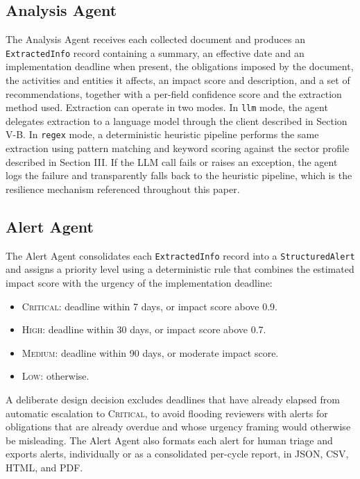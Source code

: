 \documentclass[conference]{IEEEtran}
\begin{document}
\subsection{Analysis Agent}

The Analysis Agent receives each collected document and produces an \texttt{ExtractedInfo} record containing a summary, an effective date and an implementation deadline when present, the obligations imposed by the document, the activities and entities it affects, an impact score and description, and a set of recommendations, together with a per-field confidence score and the extraction method used. Extraction can operate in two modes. In \texttt{llm} mode, the agent delegates extraction to a language model through the client described in Section V-B. In \texttt{regex} mode, a deterministic heuristic pipeline performs the same extraction using pattern matching and keyword scoring against the sector profile described in Section III. If the LLM call fails or raises an exception, the agent logs the failure and transparently falls back to the heuristic pipeline, which is the resilience mechanism referenced throughout this paper.

\subsection{Alert Agent}

The Alert Agent consolidates each \texttt{ExtractedInfo} record into a \texttt{StructuredAlert} and assigns a priority level using a deterministic rule that combines the estimated impact score with the urgency of the implementation deadline:

\begin{itemize}
\item \textsc{Critical}: deadline within 7 days, or impact score above 0.9.
\item \textsc{High}: deadline within 30 days, or impact score above 0.7.
\item \textsc{Medium}: deadline within 90 days, or moderate impact score.
\item \textsc{Low}: otherwise.
\end{itemize}

A deliberate design decision excludes deadlines that have already elapsed from automatic escalation to \textsc{Critical}, to avoid flooding reviewers with alerts for obligations that are already overdue and whose urgency framing would otherwise be misleading. The Alert Agent also formats each alert for human triage and exports alerts, individually or as a consolidated per-cycle report, in JSON, CSV, HTML, and PDF.
\end{document}
